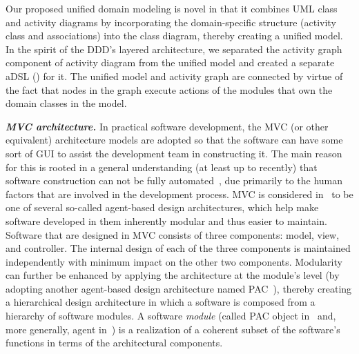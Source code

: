 Our proposed unified domain modeling is novel in that it combines UML class and activity diagrams by incorporating the domain-specific structure (activity class and associations) into the class diagram, thereby creating a unified model. In the spirit of the DDD's layered architecture, we separated the activity graph component of activity diagram from the unified model and created a separate aDSL (\agl) for it. The unified model and activity graph are connected by virtue of the fact that nodes in the graph execute actions of the modules that own the domain classes in the model.

\textbf{\textit{MVC architecture.}}
In practical software development, the MVC (or other equivalent) architecture models are adopted so that the software can have some sort of GUI to assist the development team in constructing it. The main reason for this is rooted in a general understanding (at least up to recently) that software construction can not be fully automated~\cite{fuggetta_software_2014}, due primarily to the human factors that are involved in the development process. 
%
MVC is considered in~\cite{calvary_single-user_1997} to be one of several so-called agent-based design architectures, which help make software developed in them inherently modular and thus easier to maintain. 
Software that are designed in MVC consists of three components: model, view, and controller.
The internal design of each of the three components is maintained independently with minimum impact on the other two components. Modularity can further be enhanced by applying the architecture at the module's level (\eg by adopting another agent-based design architecture named PAC~\cite{coutaz_pac:_1987}), thereby creating a hierarchical design architecture in which a software is composed from a hierarchy of software modules. A software \textit{module} (called PAC object in~\cite{coutaz_pac:_1987} and, more generally, agent in~\cite{calvary_single-user_1997}) is a realization of a coherent subset of the software's functions in terms of the architectural components.

%

